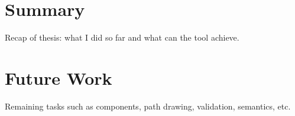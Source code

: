 \section{Summary}

Recap of thesis: what I did so far and what can the tool achieve.

\section{Future Work}

Remaining tasks such as components, path drawing, validation, semantics, etc.
